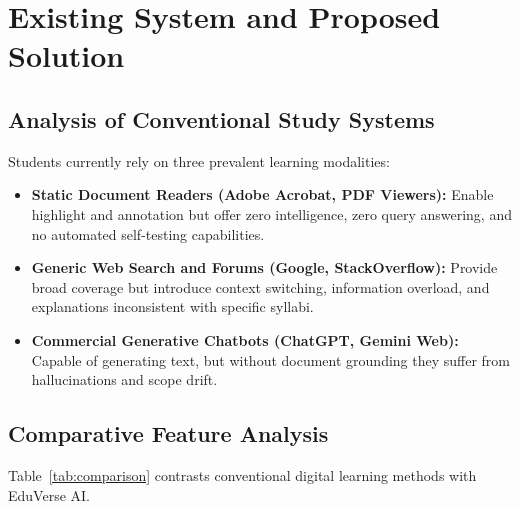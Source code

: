 \documentclass[11pt,a4paper]{report}
\begin{document}
\chapter{Existing System and Proposed Solution}
\label{ch:existing_proposed}

\section{Analysis of Conventional Study Systems}
Students currently rely on three prevalent learning modalities:
\begin{itemize}[noitemsep, topsep=1pt]
    \item \textbf{Static Document Readers (Adobe Acrobat, PDF Viewers):} Enable highlight and annotation but offer zero intelligence, zero query answering, and no automated self-testing capabilities.
    \item \textbf{Generic Web Search and Forums (Google, StackOverflow):} Provide broad coverage but introduce context switching, information overload, and explanations inconsistent with specific syllabi.
    \item \textbf{Commercial Generative Chatbots (ChatGPT, Gemini Web):} Capable of generating text, but without document grounding they suffer from hallucinations and scope drift.
\end{itemize}

\section{Comparative Feature Analysis}
Table~\ref{tab:comparison} contrasts conventional digital learning methods with EduVerse AI.
\end{document}
